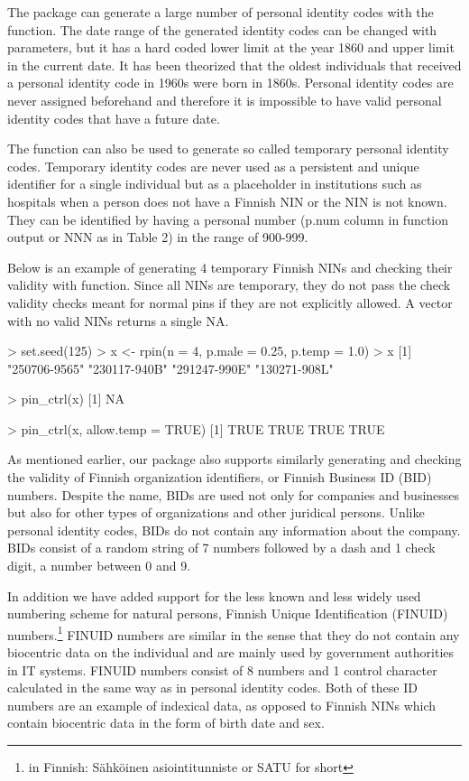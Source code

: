 The  package can generate a large number of personal identity codes with the  function. The date range of the generated identity codes can be changed with parameters, but it has a hard coded lower limit at the year 1860 and upper limit in the current date. It has been theorized that the oldest individuals that received a personal identity code in 1960s were born in 1860s. Personal identity codes are never assigned beforehand and therefore it is impossible to have valid personal identity codes that have a future date.

The function can also be used to generate so called temporary personal identity codes. Temporary identity codes are never used as a persistent and unique identifier for a single individual but as a placeholder in institutions such as hospitals when a person does not have a Finnish NIN or the NIN is not known. They can be identified by having a personal number (p.num column in  function output or NNN as in Table 2) in the range of 900-999.

Below is an example of generating 4 temporary Finnish NINs and checking their validity with  function. Since all NINs are temporary, they do not pass the check validity checks meant for normal pins if they are not explicitly allowed. A vector with no valid NINs returns a single NA.

\begin{example}
  > set.seed(125)
  > x <- rpin(n = 4, p.male = 0.25, p.temp = 1.0)
  > x
  [1] "250706-9565" "230117-940B" "291247-990E" "130271-908L"
  
  > pin_ctrl(x)
  [1] NA
  
  > pin_ctrl(x, allow.temp = TRUE)
  [1] TRUE TRUE TRUE TRUE
\end{example}

As mentioned earlier, our package also supports similarly generating and checking the validity of Finnish organization identifiers, or Finnish Business ID (BID) numbers. Despite the name, BIDs are used not only for companies and businesses but also for other types of organizations and other juridical persons. Unlike personal identity codes, BIDs do not contain any information about the company. BIDs consist of a random string of 7 numbers followed by a dash and 1 check digit, a number between 0 and 9. 

In addition we have added support for the less known and less widely used numbering scheme for natural persons, Finnish Unique Identification (FINUID) numbers.\footnote{in Finnish: Sähköinen asiointitunniste or SATU for short} FINUID numbers are similar in the sense that they do not contain any biocentric data on the individual and are mainly used by government authorities in IT systems. FINUID numbers consist of 8 numbers and 1 control character calculated in the same way as in personal identity codes. Both of these ID numbers are an example of indexical data, as opposed to Finnish NINs which contain biocentric data in the form of birth date and sex.

